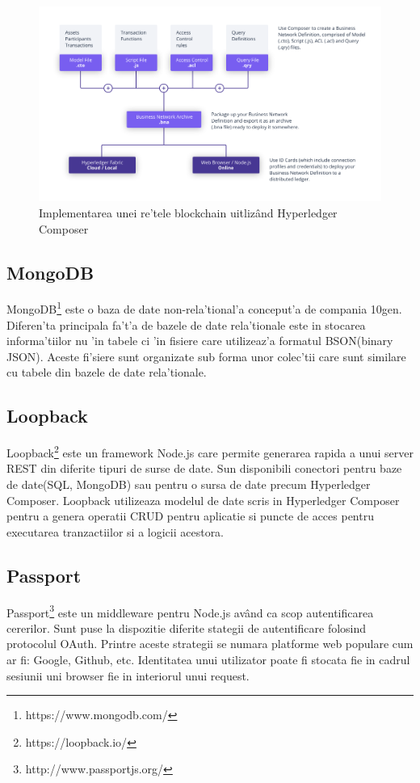 \documentclass[12pt,a4paper,twoside]{report}
\begin{document}
		\begin{figure}[H]
		\begin{center}
			\includegraphics[scale=0.60]{img/composer.png}
			\caption{Implementarea unei re'tele blockchain uitliz\^and Hyperledger Composer}
  			\label{fig:comp}
  		\end{center}
  		\end{figure}
  		
\subsection{MongoDB}
MongoDB\footnote{https://www.mongodb.com/} este o baza de date non-rela'tional'a conceput'a de compania 10gen. Diferen'ta principala fa't'a de bazele de date rela'tionale este in stocarea informa'tiilor nu 'in tabele ci 'in fisiere care utilizeaz'a formatul BSON(binary JSON). Aceste fi'siere sunt organizate sub forma unor colec'tii care sunt similare cu tabele din bazele de date rela'tionale.


\subsection{Loopback}
Loopback\footnote{https://loopback.io/} este un framework Node.js care permite generarea rapida a unui server REST din diferite tipuri de surse de date. Sun disponibili conectori pentru baze de date(SQL, MongoDB) sau pentru o sursa de date precum Hyperledger Composer. Loopback utilizeaza modelul de date scris in Hyperledger Composer pentru a genera operatii CRUD pentru aplicatie si puncte de acces pentru executarea tranzactiilor si a logicii acestora.

\subsection{Passport}
Passport\footnote{http://www.passportjs.org/} este un middleware pentru Node.js av\^and ca scop autentificarea cererilor. Sunt puse la dispozitie diferite stategii de autentificare folosind protocolul OAuth. Printre aceste strategii se numara platforme web populare cum ar fi: Google, Github, etc. Identitatea unui utilizator poate fi stocata fie in cadrul sesiunii uni browser fie in interiorul unui request.
\end{document}
